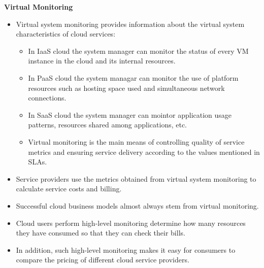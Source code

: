 \documentclass[a4paper, 12pt]{article}
\begin{document}
\textbf{Virtual Monitoring}
\begin{itemize}
\item
Virtual system monitoring provides information about the virtual system characteristics of cloud services:
\begin{itemize}
\item
In IaaS cloud the system manager can monitor the status of every VM instance in the cloud and its internal resources. 
\item
In PaaS cloud the system managar can monitor the use of platform resources such as hosting space used and simultaneous network connections.
\item
In SaaS cloud the system manager can mointor application usage patterns, resources shared among applications, etc.
\item
Virtual monitoring is the main means of controlling quality of service metrics and ensuring service delivery according to the values mentioned in SLAs.
\end{itemize}
\item
Service providers use the metrics obtained from virtual system monitoring to calculate service costs and billing.
\item
Successful cloud business models almost always stem from virtual monitoring.
\item
Cloud users perform high-level monitoring determine how many resources they have consumed so that they can check their bills.
\item
In addition, such high-level monitoring makes it easy for consumers to compare the pricing of different cloud service providers.

\end{itemize}
\end{document}
